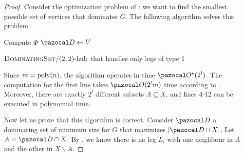 \begin{proof}
    Consider the optimization problem of : we want to find the smallest possible set of vertices that dominates $G$. The following algorithm solves this problem:

    \begin{algorithm}
        Compute $\Phi$\;
        $\D \gets V$\;
        \caption{$\prob{DominatingSet}/\sdhub[2,2]$ that handles only legs of type 1}
        \label{algo:domset-22-1}
    \end{algorithm}



    Since $m = \poly(n)$, the algorithm operates in time $\O^\star(2^l)$. The computation for the first line takes $\O(2^lm)$ time according to . Moreover, there are exactly $2^l$ different subsets $A \subseteq X$, and lines 4-12 can be executed in polynomial time.

    \medskip

    Now let us prove that this algorithm is correct. Consider $\D$ a dominating set of minimum size for $G$ that maximizes $|\D \cap X|$. Let $A = \D \cap X$. By , we know there is no leg $L_i$ with one neighbour in $A$ and the other in $X \backslash A$.
    

\end{proof}
